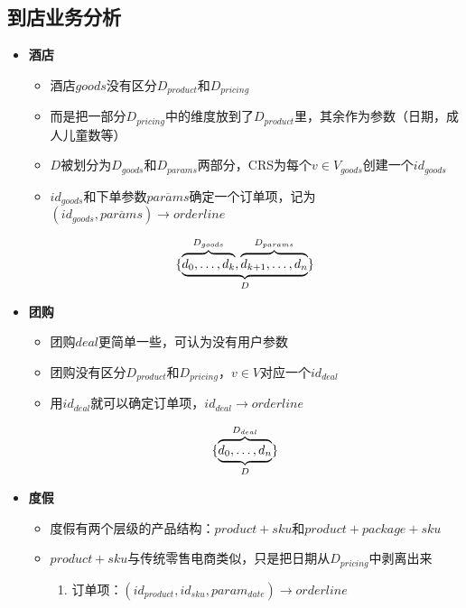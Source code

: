 \documentclass[a4paper]{article}
\begin{document}
\subsection{到店业务分析}
\begin{itemize}
    \item \textbf{酒店}
        \begin{itemize}
            \item 酒店$goods$没有区分$D_{product}$和$D_{pricing}$
            \item 而是把一部分$D_{pricing}$中的维度放到了$D_{product}$里，其余作为参数（日期，成人儿童数等）
            \item $D$被划分为$D_{goods}$和$D_{params}$两部分，CRS为每个$v \in V_{goods}$创建一个$id_{goods}$
            \item $id_{goods}$和下单参数$\overline{params}$确定一个订单项，记为$(id_{goods}, \overline{params}) \longrightarrow orderline$
        \end{itemize}
        \begin{equation}
            \{\underbrace{%
                \overbrace{\mathstrut d_0,\ldots,d_k}^{D_{goods}},
                \overbrace{\mathstrut d_{k+1},\ldots,d_n}^{D_{params}}
            }
            _{D} \}
        \end{equation}
    \item \textbf{团购}
        \begin{itemize}
            \item 团购$deal$更简单一些，可认为没有用户参数
            \item 团购没有区分$D_{product}$和$D_{pricing}$，$v \in V$对应一个$id_{deal}$
            \item 用$id_{deal}$就可以确定订单项，$id_{deal} \longrightarrow orderline$
        \end{itemize}
        \begin{equation}
            \{\underbrace{%
                \overbrace{\mathstrut d_0,\ldots,d_n}^{D_{deal}}
            }
            _{D} \}
        \end{equation}        
    \item \textbf{度假}
        \begin{itemize}
            \item 度假有两个层级的产品结构：$product+sku$和$product+package+sku$
            \item $product+sku$与传统零售电商类似，只是把日期从$D_{pricing}$中剥离出来
            \begin{enumerate}
                \item 订单项：$(id_{product}, id_{sku}, param_{date}) \longrightarrow orderline$

\end{enumerate}
\end{itemize}
\end{itemize}
\end{document}
